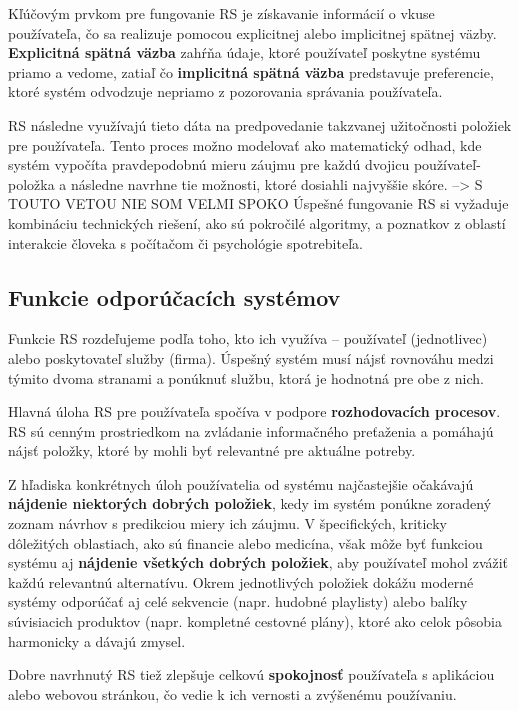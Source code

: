 Kľúčovým prvkom pre fungovanie RS je získavanie informácií o vkuse používateľa, čo sa realizuje pomocou explicitnej alebo implicitnej spätnej väzby.
\textbf{Explicitná spätná väzba} zahŕňa údaje, ktoré používateľ poskytne systému priamo a vedome, zatiaľ čo
\textbf{implicitná spätná väzba} predstavuje preferencie, ktoré systém odvodzuje nepriamo z pozorovania správania používateľa. \cite{Ricci}

RS následne využívajú tieto dáta na predpovedanie takzvanej užitočnosti položiek pre používateľa. Tento proces možno modelovať ako matematický odhad, kde systém vypočíta pravdepodobnú mieru záujmu pre každú dvojicu používateľ-položka a následne navrhne tie možnosti, ktoré dosiahli najvyššie skóre. \cite{Ricci} --> S TOUTO VETOU NIE SOM VELMI SPOKO Úspešné fungovanie RS si vyžaduje kombináciu technických riešení, ako sú pokročilé algoritmy, a poznatkov z oblastí interakcie človeka s počítačom či psychológie spotrebiteľa. \cite{Ricci}


\subsection{Funkcie odporúčacích systémov}
Funkcie RS rozdeľujeme podľa toho, kto ich využíva – používateľ (jednotlivec) alebo poskytovateľ služby (firma). Úspešný systém musí nájsť rovnováhu medzi týmito dvoma stranami a ponúknuť službu, ktorá je hodnotná pre obe z nich. \cite{Ricci}

Hlavná úloha RS pre používateľa spočíva v podpore \textbf{rozhodovacích procesov}. RS sú cenným prostriedkom na zvládanie informačného preťaženia a pomáhajú nájsť položky, ktoré by mohli byť relevantné pre aktuálne potreby.

Z hľadiska konkrétnych úloh používatelia od systému najčastejšie očakávajú \textbf{nájdenie niektorých dobrých položiek}, kedy im systém ponúkne zoradený zoznam návrhov s predikciou miery ich záujmu. V špecifických, kriticky dôležitých oblastiach, ako sú financie alebo medicína, však môže byť funkciou systému aj \textbf{nájdenie všetkých dobrých položiek}, aby používateľ mohol zvážiť každú relevantnú alternatívu. Okrem jednotlivých položiek dokážu moderné systémy odporúčať aj celé sekvencie (napr. hudobné playlisty) alebo balíky súvisiacich produktov (napr. kompletné cestovné plány), ktoré ako celok pôsobia harmonicky a dávajú zmysel. \cite{Ricci}

Dobre navrhnutý RS tiež zlepšuje celkovú \textbf{spokojnosť} používateľa s aplikáciou alebo webovou stránkou, čo vedie k ich vernosti a zvýšenému používaniu. \cite{Ricci}

